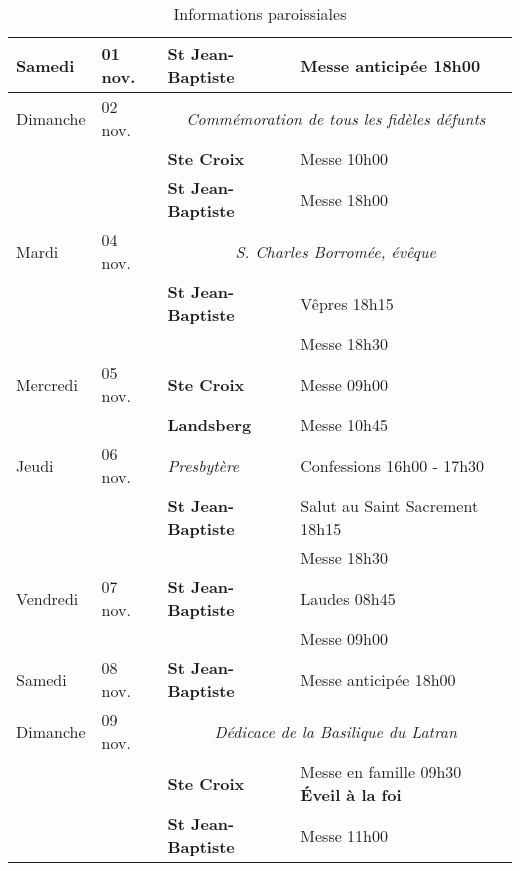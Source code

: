 \documentclass[french,11pt]{article}
\newcommand{\sjb}{\textbf{St Jean-Baptiste}}
\newcommand{\sx}{\textbf{Ste Croix}}
\newcommand{\landsberg}{\textbf{Landsberg}}
\newcommand{\NewsItem}[1]{%
\vspace{3pt}
\underline{\textbf{#1}}
		  }
\begin{document}

\begin{table}[!h]
\centering
\caption{Informations paroissiales}
\begin{tabularx}{\columnwidth}{|p{}p{}|p{}X|}
\hline
Samedi & 01 nov. & \sjb & Messe anticipée 18h00 \\ \hline
Dimanche &  02 nov.  & 
\multicolumn{2}{c|}{
\emph{Commémoration de tous les fidèles défunts}
} \\
& &	\sx & Messe 10h00 \\
& &	\sjb & Messe 18h00 \\
	 \hline
	 \hline
Mardi &  04 nov.  & 
\multicolumn{2}{c|}{
\emph{S. Charles Borromée, évêque}
} \\
& & \sjb & Vêpres 18h15 \\
& &      & Messe 18h30 \\
\hline
Mercredi &  05 nov.  & 		\sx & Messe 09h00 \\
&  & 		\landsberg & Messe 10h45 \\
\hline
Jeudi &  06 nov.   &	\emph{Presbytère} &	Confessions  16h00 - 17h30 \\
 &  &		\sjb &Salut au Saint Sacrement 18h15 \\
& &		&Messe 18h30 \\
\hline
Vendredi &  07 nov.  & 	\sjb & Laudes 08h45 \\
& &		& Messe 09h00 \\
\hline
Samedi &  08 nov.  & 	\sjb & Messe anticipée 18h00 \\
\hline
Dimanche &  09 nov.  & 
\multicolumn{2}{c|}{
\emph{Dédicace de la Basilique du Latran}
} \\
& &		\sx & Messe en famille 09h30 \textbf{Éveil à la foi} \\
& &		\sjb & Messe 11h00 \\
\hline
\end{tabularx}
\end{table}
\end{document}
